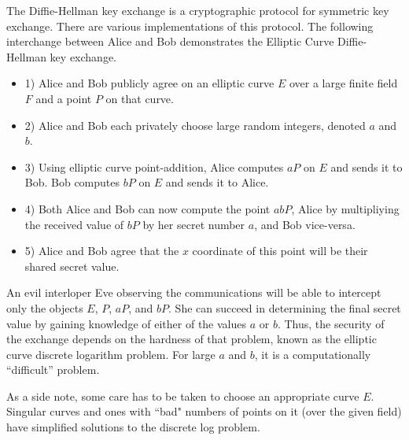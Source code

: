 \documentclass[12pt]{article}
\begin{document}
The Diffie-Hellman key exchange is a cryptographic protocol for symmetric key exchange.  There are various implementations of this protocol.  The following interchange between Alice and Bob demonstrates the Elliptic Curve Diffie-Hellman key exchange.
\begin{itemize}
\item 1)  Alice and Bob publicly agree on an elliptic curve $E$ over a large finite field $F$ and a point $P$ on that curve.
\item 2)  Alice and Bob each privately choose large random integers, denoted $a$ and $b$.
\item 3)  Using elliptic curve point-addition, Alice computes $aP$ on $E$ and sends it to Bob.  Bob computes $bP$ on $E$ and sends it to Alice.
\item 4)  Both Alice and Bob can now compute the point $abP$, Alice by multipliying the received value of $bP$ by her secret number $a$, and Bob vice-versa.
\item 5)  Alice and Bob agree that the $x$ coordinate of this point will be their shared secret value.
\end{itemize}

An evil interloper Eve observing the communications will be able to intercept only the objects $E$, $P$, $aP$, and $bP$.  She can succeed in determining the final secret value by gaining knowledge of either of the values $a$ or $b$.  Thus, the security of the exchange depends on the hardness of that problem, known as the elliptic curve discrete logarithm problem.  For large $a$ and $b$, it is a computationally ``difficult'' problem.

As a side note, some care has to be taken to choose an appropriate curve $E$.  Singular curves and ones with ``bad" numbers of points on it (over the given field) have simplified solutions to the discrete log problem.
\end{document}
